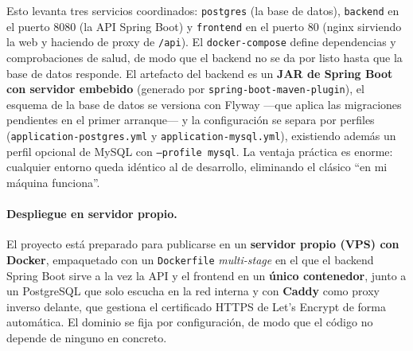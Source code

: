 \documentclass[12pt,a4paper]{report}
\begin{document}
Esto levanta tres servicios coordinados: \texttt{postgres} (la base de datos), \texttt{backend} en el puerto 8080 (la API Spring Boot) y \texttt{frontend} en el puerto 80 (nginx sirviendo la web y haciendo de proxy de \texttt{/api}). El \texttt{docker-compose} define dependencias y comprobaciones de salud, de modo que el backend no se da por listo hasta que la base de datos responde. El artefacto del backend es un \textbf{JAR de Spring Boot con servidor embebido} (generado por \texttt{spring-boot-maven-plugin}), el esquema de la base de datos se versiona con Flyway —que aplica las migraciones pendientes en el primer arranque— y la configuración se separa por perfiles (\texttt{application-postgres.yml} y \texttt{application-mysql.yml}), existiendo además un perfil opcional de MySQL con \texttt{--profile mysql}. La ventaja práctica es enorme: cualquier entorno queda idéntico al de desarrollo, eliminando el clásico ``en mi máquina funciona''.

\paragraph{Despliegue en servidor propio.} El proyecto está preparado para publicarse en un \textbf{servidor propio (VPS) con Docker}, empaquetado con un \texttt{Dockerfile} \emph{multi-stage} en el que el backend Spring Boot sirve a la vez la API y el frontend en un \textbf{único contenedor}, junto a un PostgreSQL que solo escucha en la red interna y con \textbf{Caddy} como proxy inverso delante, que gestiona el certificado HTTPS de Let's Encrypt de forma automática. El dominio se fija por configuración, de modo que el código no depende de ninguno en concreto.
\end{document}
